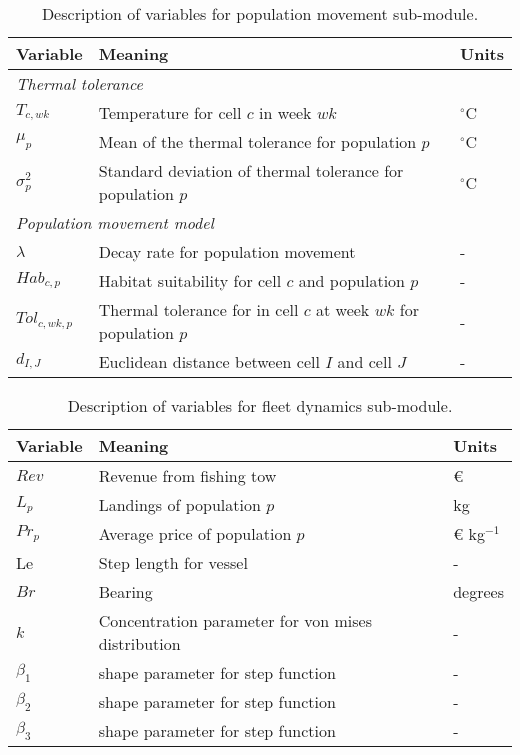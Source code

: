 \begin{table}[!ht]
	\centering
	\caption{Description of variables for population movement sub-module.}
	\begin{tabular}{p{1.5cm} p{8cm} p{1.5cm}}
		\toprule
		Variable & Meaning & Units \\
		\hline
		\multicolumn{3}{l}{\textit{Thermal tolerance}} \\
		\hline
		$T_{c,wk}$ & Temperature for cell $c$ in week $wk$ & $^\circ$C \\
		$\mu_{p}$ & Mean of the thermal tolerance for population $p$ & $^\circ$C \\
		$\sigma^{2}_{p}$ & Standard deviation of thermal tolerance for
		population $p$ & $^\circ$C \\
		\hline
		\multicolumn{3}{l}{\textit{Population movement model}} \\
		\hline
		$\lambda$ & Decay rate for population movement & - \\
		$Hab_{c,p}$ & Habitat suitability for cell $c$ and
		population $p$ & - \\
		$Tol_{c,wk,p}$ & Thermal tolerance for in cell $c$ at week $wk$
		for population $p$ & - \\
		$d_{I,J}$ & Euclidean distance between cell $I$ and cell $J$ & - \\
		\bottomrule
		\end{tabular}
	\end{table}

\begin{table}[!ht]
	\centering
	\caption{Description of variables for fleet dynamics sub-module.}
	\begin{tabular}{p{1.5cm} p{8cm} p{1.5cm}}
		\toprule
		Variable & Meaning & Units \\
		\hline
		$Rev$ & Revenue from fishing tow & \euro \\
		$L_{p}$ & Landings of population $p$ & kg \\
		$Pr_{p}$ & Average price of population $p$ & \euro
		\hspace{0.1cm} kg$^{-1}$ \\
		Le & Step length for vessel & - \\
		$Br$ & Bearing & degrees \\
		$k$ & Concentration parameter for von mises distribution & - \\
		$\beta_{1}$ & shape parameter for step function & - \\
		$\beta_{2}$ & shape parameter for step function & - \\
		$\beta_{3}$ & shape parameter for step function & - \\
		\bottomrule
	\end{tabular}
\end{table}


